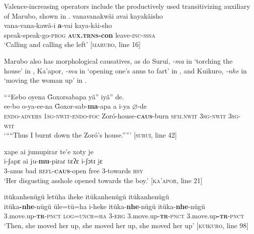 \documentclass[output=paper,
modfonts,nonflat
]{langsci/langscibook}
\begin{document}
Valence-increasing operators include the productively used transitivizing auxiliary of Marubo, shown in .
\ea\label{ex:intro:13} vanavanakwãi avai kayakãisho \\[.3em]
\gll vana-vana-kawã-i             \textbf{a}-vai                 kaya-kãi-sho            \\
     speak-speak-go-\textsc{prog} \textbf{\textsc{aux.trns}-con} leave-\textsc{inc-sssa} \\
\glt `Calling and calling she left' [\textsc{marubo}, line 16]
\z

Marubo also has morphological causatives, as do Suruí, \textit{-ma} in ‘torching the house’ in , Ka’apor, \textit{-mu} in ‘opening one’s anus to fart’ in , and Kuikuro, \textit{-nhe} in ‘moving the woman up’ in .

\ea\label{ex:intro:14} ““Eebo oyena \~{G}oxorsabapa yã” iyã” de.\\[.3em]
\gll ee-bo o-ya-ee-na \~{G}oxor-sab-\textbf{ma}-apa a i-ya \(\varnothing\)-de\\
\textsc{endo-advers} \textsc{1sg-nwit-endo-foc} Zoró-house-\textbf{\textsc{caus}}-burn \textsc{sfm.nwit} \textsc{3sg-nwit} \textsc{3sg-wit}\\
\glt ‘““Thus I burnt down the Zoró's house.””’{\footnotemark}  [\textsc{suruí}, line 42]\\
\z
{}

\ea\label{ex:intro:15} xape ai jumupirar te’e xoty je \\[.3em]
\gll i-ʃapɛ ai ju-\textbf{mu}-piɾaɾ tɛʔɛ i-ʃɔtɪ jɛ \\
3-anus bad \textsc{refl}-\textbf{\textsc{caus}}-open free 3-towards \textsc{hsy} \\
\glt ‘Her disgusting asshole opened towards the boy.’ [\textsc{ka’apor}, line 21]\\
\z 

\ea\label{ex:intro:16} itükanhenügü letüha iheke itükanhenügü itükanhenügü \\[.3em]
\gll itüka\textbf{-nhe}-nügü	üle=tü=ha	i-heke itüka-\textbf{nhe}-nügü itüka-\textbf{nhe}-nügü \\
3.move.up-\textsc{\textbf{tr}-pnct} 	\textsc{log=uncr}=\textsc{ha}	3-\textsc{erg} 3.move.up-\textsc{\textbf{tr}-pnct} 3.move.up\textsc{\textbf{-tr}-pnct} \\
\glt ‘Then, she moved her up, she moved her up, she moved her up’ [\textsc{kuikuro}, line 98]\\
\z
\end{document}
